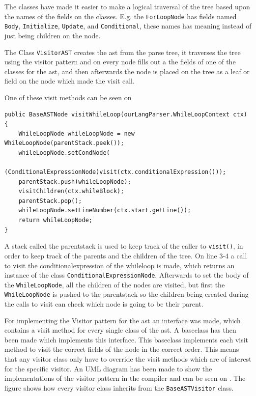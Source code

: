 The classes have made it easier to make a logical traversal of the tree based upon the names of the fields on the classes.
E.g. the \texttt{ForLoopNode} has fields named \texttt{Body}, \texttt{Initialize}, \texttt{Update}, and \texttt{Conditional}, these names has meaning instead of just being children on the node.

The Class \texttt{VisitorAST} creates the \acrshort{ast} from the parse tree, it traverses the tree using the visitor pattern and on every node fills out a the fields of one of the classes for the \acrshort{ast}, and then afterwards the node is placed on the tree as a leaf or field on the node which made the visit call.

One of these visit methods can be seen on 

\begin{lstlisting}[caption=The Visit Method for WhileLoopNode,frame=tlrb,label={lst:VisitorASTCode}]
public BaseASTNode visitWhileLoop(ourLangParser.WhileLoopContext ctx) {
    WhileLoopNode whileLoopNode = new WhileLoopNode(parentStack.peek());
    whileLoopNode.setCondNode(
    	(ConditionalExpressionNode)visit(ctx.conditionalExpression()));
    parentStack.push(whileLoopNode);
    visitChildren(ctx.whileBlock);
    parentStack.pop();
    whileLoopNode.setLineNumber(ctx.start.getLine());
    return whileLoopNode;
}
\end{lstlisting}
A stack called the parentstack is used to keep track of the caller to \texttt{visit()}, in order to keep track of the parents and the children of the tree.
On line 3-4 a call to visit the conditionalexpression of the whileloop is made, which returns an instance of the class \texttt{ConditionalExpressionNode}. 
Afterwards to set the body of the \texttt{WhileLoopNode}, all the children of the nodes are visited, but first the \texttt{WhileLoopNode} is pushed to the parentstack so the children being created during the calls to visit can check which node is going to be their parent.

For implementing the Visitor pattern for the \acrshort{ast} an interface was made, which contains a visit method for every single class of the \acrshort{ast}.
A baseclass has then been made which implements this interface. 
This baseclass implements each visit method to visit the correct fields of the node in the correct order.
This means that any visitor class only have to override the visit methods which are of interest for the specific visitor.
An UML diagram has been made to show the implementations of the visitor pattern in the compiler and can be seen on .
The figure shows how every visitor class inherits from the \texttt{BaseASTVisitor} class.

